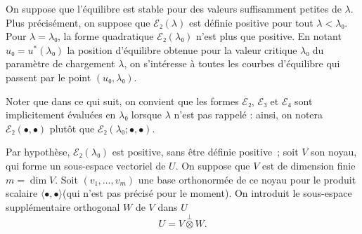 \documentclass[12pt, final]{scrartcl}
\theoremstyle{definition}
\begin{document}
On suppose que l'équilibre est stable pour des valeurs suffisamment petites de
\(λ\). Plus précisément, on suppose que \(ℰ₂(λ)\) est définie positive pour tout
\(λ < λ₀\). Pour \(λ = λ₀\), la forme quadratique \(ℰ₂(λ₀)\) n'est plus que
positive. En notant \(u₀ = u^{\ast}(λ₀)\) la position d'équilibre obtenue pour
la valeur critique \(λ₀\) du paramètre de chargement \(λ\), on s'intéresse à
toutes les courbes d'équilibre qui passent par le point \((u₀, λ₀)\).

Noter que dans ce qui suit, on convient que les formes \(ℰ₂\), \(ℰ₃\) et \(ℰ₄\)
sont implicitement évaluées en \(λ₀\) lorsque \(λ\) n'est pas rappelé : ainsi,
on notera \(ℰ₂(•, •)\) plutôt que \(ℰ₂(λ₀ ; •, •)\).

Par hypothèse, \(ℰ₂(λ₀)\) est positive, sans être définie
positive~; soit \(V\) son noyau, qui forme un sous-espace vectoriel de \(U\). On
suppose que \(V\) est de dimension finie \(m = \dim V\). Soit
\((v₁, \ldots, v_m)\) une base orthonormée de ce noyau pour le produit scalaire
\(〈 •, • 〉\)(qui n'est pas précisé pour le moment). On introduit le
sous-espace supplémentaire orthogonal \(W\) de \(V\) dans \(U\)
\begin{equation}
  U = V \overset{\perp}{\otimes} W.
\end{equation}
\end{document}
